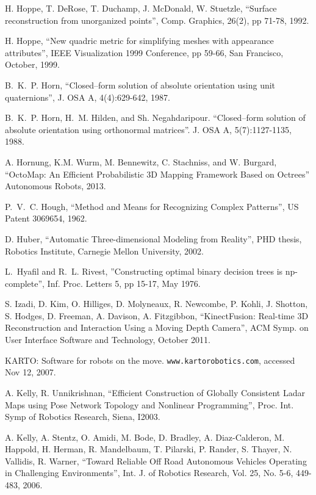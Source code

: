 \documentclass[twocolumn,oneside]{book}
\begin{document}
\begin{thebibliography}{99}
H. Hoppe, T. DeRose, T. Duchamp, J. McDonald, W. Stuetzle,
``Surface reconstruction from unorganized points'',
Comp. Graphics, 26(2), pp 71-78, 1992.

H. Hoppe,	
``New quadric metric for simplifying meshes with appearance attributes'',
IEEE Visualization 1999 Conference, pp 59-66, San Francisco, October, 1999.

B.~K.~P. Horn,
``Closed--form solution of absolute orientation using unit quaternions'',
J. OSA A, 4(4):629-642, 1987.

B.~K.~P. Horn, H.~M. Hilden, and Sh. Negahdaripour.
``Closed--form solution of absolute orientation using orthonormal matrices''.
J. OSA A, 5(7):1127-1135, 1988.

A. Hornung, K.M. Wurm, M. Bennewitz, C. Stachniss, and W. Burgard,
``OctoMap: An Efficient Probabilistic 3D Mapping Framework Based on Octrees''
Autonomous Robots, 2013.

P.~V.~C. Hough,
``Method and Means for Recognizing Complex Patterns'',
US Patent 3069654, 1962.

D. Huber,
``Automatic Three-dimensional Modeling from Reality'',
PHD thesis, Robotics Institute, Carnegie Mellon University, 2002.

L.~Hyafil and R.~L. Rivest,
''Constructing optimal binary decision trees is np-complete'',
Inf. Proc. Letters 5, pp 15-17, May 1976.

S. Izadi, D. Kim, O. Hilliges, D. Molyneaux, R. Newcombe, P. Kohli,
J. Shotton, S. Hodges, D. Freeman, A. Davison, A. Fitzgibbon,
``KinectFusion: Real-time 3D Reconstruction and Interaction Using a Moving Depth Camera'',
ACM Symp. on User Interface Software and Technology, October 2011.

KARTO: Software for robots on the move.
\verb+www.kartorobotics.com+, accessed Nov 12, 2007.


A. Kelly, R. Unnikrishnan,
``Efficient Construction of Globally Consistent Ladar Maps using Pose Network Topology
and Nonlinear Programming'',
Proc. Int. Symp of Robotics Research, Siena, I2003.

A. Kelly, A. Stentz, O. Amidi, M. Bode, D. Bradley, A. Diaz-Calderon, M. Happold, H. Herman, R. Mandelbaum,
T. Pilarski, P. Rander, S. Thayer, N. Vallidis, R. Warner,
``Toward Reliable Off Road Autonomous Vehicles Operating in Challenging Environments'',
Int. J. of Robotics Research, Vol. 25, No. 5-6, 449-483, 2006.


\end{thebibliography}
\end{document}
